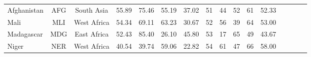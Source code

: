 \begin{longtable}[H]{lccccccccccccccc}
Afghanistan                       & AFG           & South Asia         & 55.89       & 75.46            & 55.19                     & 37.02           & 51             & 44                  & 52                           & 61                 & 52.33                  \\
Mali                              & MLI           & West Africa        & 54.34       & 69.11            & 63.23                     & 30.67           & 52             & 56                  & 39                           & 64                 & 53.00                  \\
Madagascar                        & MDG           & East Africa        & 52.43       & 85.40            & 26.10                     & 45.80           & 53             & 17                  & 65                           & 49                 & 43.67                  \\
Niger                             & NER           & West Africa        & 40.54       & 39.74            & 59.06                     & 22.82           & 54             & 61                  & 47                           & 66                 & 58.00                 \\
\hline \hline
\end{longtable}
\endgroup
